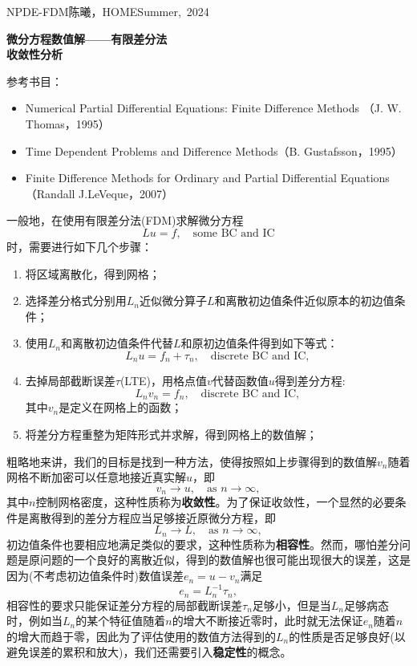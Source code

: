 \documentclass[a4paper,10pt]{ctexart}
\begin{document}
\hfill\vbox{\hbox{NPDE-FDM}\hbox{陈曦，HOME}\hbox{Summer, 2024}}

\begin{center}\Large
    \textbf{微分方程数值解——有限差分法}\\{\normalsize\bf {收敛性分析}}
\end{center}
\vskip 30pt
\small {参考书目：
\begin{itemize}
    \item Numerical Partial Differential Equations: Finite Difference Methods （J. W. Thomas，1995）
    \item Time Dependent Problems and Difference Methods（B. Gustafsson，1995）
    \item Finite Difference Methods for Ordinary and Partial Differential Equations（Randall J.LeVeque，2007）
\end{itemize}}
\vskip 30pt
一般地，在使用有限差分法(FDM)求解微分方程
\[
    L u = f,\quad \text{some BC and IC}
\]
时，需要进行如下几个步骤：
\begin{enumerate}
    \item 将区域离散化，得到网格；
    \item 选择差分格式分别用$ L_n $近似微分算子$ L $和离散初边值条件近似原本的初边值条件；
    \item 使用$ L_n $和离散初边值条件代替$ L $和原初边值条件得到如下等式：
    \[
        L_n u = f_n + \tau_n,\quad \text{discrete BC and IC},
    \]
    \item 去掉局部截断误差$ \tau $(LTE)，用格点值$ v $代替函数值$ u $得到差分方程:
    \[
        L_n v_n = f_n, \quad \text{discrete BC and IC},
    \]
    其中$ v_n $是定义在网格上的函数；
    \item 将差分方程重整为矩阵形式并求解，得到网格上的数值解；
\end{enumerate}
粗略地来讲，我们的目标是找到一种方法，使得按照如上步骤得到的数值解$ v_n $随着网格不断加密可以任意地接近真实解$ u $，即
\[
    v_n\longrightarrow u,\quad \text{as } n\longrightarrow\infty,
\]
其中$ n $控制网格密度，这种性质称为\textbf{收敛性}。为了保证收敛性，一个显然的必要条件是离散得到的差分方程应当足够接近原微分方程，即
\[
    L_n \longrightarrow L,\quad \text{as } n\longrightarrow\infty,
\]
初边值条件也要相应地满足类似的要求，这种性质称为\textbf{相容性}。然而，哪怕差分问题是原问题的一个良好的离散近似，得到的数值解也很可能出现很大的误差，这是因为(不考虑初边值条件时)数值误差$ e_n=u-v_n $满足
\[
    e_n = L_n^{-1} \tau_n,
\]
相容性的要求只能保证差分方程的局部截断误差$ \tau_n $足够小，但是当$ L_n $足够病态时，例如当$ L_n $的某个特征值随着$ n $的增大不断接近零时，此时就无法保证$ e_n $随着$ n $的增大而趋于零，因此为了评估使用的数值方法得到的$ L_n $的性质是否足够良好(以避免误差的累积和放大)，我们还需要引入\textbf{稳定性}的概念。
\end{document}
